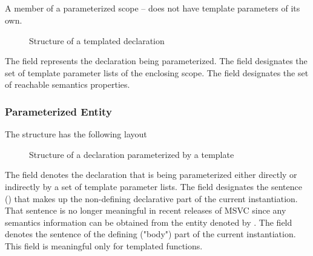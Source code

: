 

\subsection{}
\label{sec:ifc:DeclSort:Temploid}

A member of a parameterized scope -- does not have template parameters of its own.
%
\begin{figure}[H]
	\centering
	\caption{Structure of a templated declaration}
	\label{fig:ifc-type-temploid-structure}
\end{figure}
%
The  field represents the declaration being parameterized.
The  field designates the set of template parameter lists of the enclosing scope.
The  field designates the set of reachable semantics properties.



\subsubsection{Parameterized Entity}
\label{sec:ifc-parameterized-entity}

The structure  has the following layout
%
\begin{figure}[H]
	\centering
	\caption{Structure of a declaration parameterized by a template}
	\label{fig:ifc-parameterized-decl-structure}
\end{figure}
%
The  field denotes the declaration that is being 
parameterized either directly or indirectly by a set of template parameter lists.
The  field designates the sentence () that makes up the
non-defining declarative part of the current instantiation.
That sentence is no longer meaningful in recent releases of MSVC since
any semantics information can be obtained from the entity denoted
by .
The  field denotes the sentence of the defining ("body") part
of the current instantiation.  This field is meaningful only
for templated functions. 


